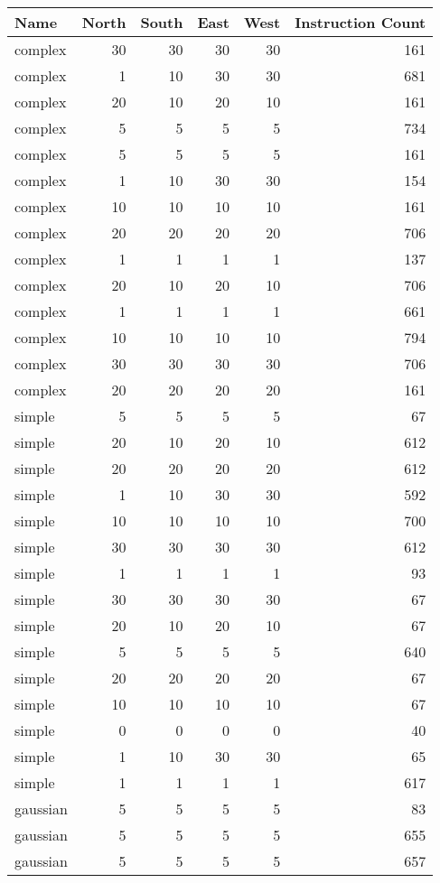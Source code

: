 \begin{tabular}{lrrrrr}
  \toprule
  Name & North & South & East & West & Instruction Count \\
  \midrule
  complex & 30 & 30 & 30 & 30 & 161 \\
  complex & 1 & 10 & 30 & 30 & 681 \\
  complex & 20 & 10 & 20 & 10 & 161 \\
  complex & 5 & 5 & 5 & 5 & 734 \\
  complex & 5 & 5 & 5 & 5 & 161 \\
  complex & 1 & 10 & 30 & 30 & 154 \\
  complex & 10 & 10 & 10 & 10 & 161 \\
  complex & 20 & 20 & 20 & 20 & 706 \\
  complex & 1 & 1 & 1 & 1 & 137 \\
  complex & 20 & 10 & 20 & 10 & 706 \\
  complex & 1 & 1 & 1 & 1 & 661 \\
  complex & 10 & 10 & 10 & 10 & 794 \\
  complex & 30 & 30 & 30 & 30 & 706 \\
  complex & 20 & 20 & 20 & 20 & 161 \\
  simple & 5 & 5 & 5 & 5 & 67 \\
  simple & 20 & 10 & 20 & 10 & 612 \\
  simple & 20 & 20 & 20 & 20 & 612 \\
  simple & 1 & 10 & 30 & 30 & 592 \\
  simple & 10 & 10 & 10 & 10 & 700 \\
  simple & 30 & 30 & 30 & 30 & 612 \\
  simple & 1 & 1 & 1 & 1 & 93 \\
  simple & 30 & 30 & 30 & 30 & 67 \\
  simple & 20 & 10 & 20 & 10 & 67 \\
  simple & 5 & 5 & 5 & 5 & 640 \\
  simple & 20 & 20 & 20 & 20 & 67 \\
  simple & 10 & 10 & 10 & 10 & 67 \\
  simple & 0 & 0 & 0 & 0 & 40 \\
  simple & 1 & 10 & 30 & 30 & 65 \\
  simple & 1 & 1 & 1 & 1 & 617 \\
  gaussian & 5 & 5 & 5 & 5 & 83 \\
  gaussian & 5 & 5 & 5 & 5 & 655 \\
  gaussian & 5 & 5 & 5 & 5 & 657 \\

\end{tabular}
